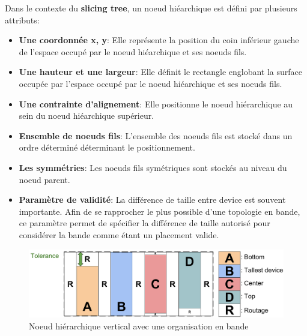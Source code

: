 \indent Dans le contexte du \textbf{slicing tree}, un noeud hiéarchique est défini par plusieurs attributs:

\begin{itemize}
\item \textbf{Une coordonnée x, y}: Elle représente la position du coin inférieur gauche de l'espace occupé par le noeud hiéarchique et ses noeuds fils.
\item \textbf{Une hauteur et une largeur}: Elle définit le rectangle englobant la surface occupée par l'espace occupé par le noeud hiéarchique et ses noeuds fils.
\item \textbf{Une contrainte d'alignement}: Elle positionne le noeud hiérarchique au sein du noeud hiéarchique supérieur.
\item \textbf{Ensemble de noeuds fils}: L'ensemble des noeuds fils est stocké dans un ordre déterminé déterminant le positionnement.
\item \textbf{Les symmétries}: Les noeuds fils symétriques sont stockés au niveau du noeud parent.
\item \textbf{Paramètre de validité}: La différence de taille entre device est souvent importante. Afin de se rapprocher le plus possible d'une topologie en bande, ce paramètre permet de spécifier la différence de taille autorisé pour considérer la bande comme étant un placement valide.
\end{itemize}
\begin{figure}[h]
\begin{center}
\includegraphics[height=0.15\textheight]{Figures/14.pdf}
\caption{Noeud hiérarchique vertical avec une organisation en bande}
\label{fig:13}
\end{center}
\end{figure} 

